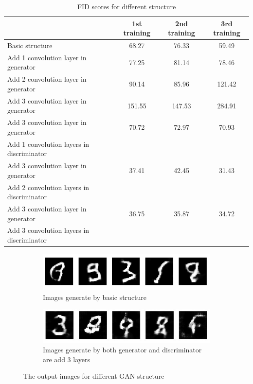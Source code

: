 \begin{table}[h]
    \centering
    \caption{FID scores for different structure}
    \begin{tabular}{|l|c|c|c|}
      \hline
      & 1st training & 2nd training & 3rd training \\
      \hline
      Basic structure & 68.27 & 76.33 & 59.49 \\
      \hline
      Add 1 convolution layer in generator & 77.25 & 81.14 & 78.46 \\
      \hline
      Add 2 convolution layer in generator & 90.14 & 85.96 & 121.42 \\
      \hline
      Add 3 convolution layer in generator & 151.55 & 147.53 & 284.91 \\
      \hline
      \multicolumn{1}{|l|}{Add 3 convolution layer in generator} & 70.72 & 72.97 & 70.93 \\
      \multicolumn{1}{|l|}{Add 1 convolution layers in discriminator} & & & \\
      \hline
      \multicolumn{1}{|l|}{Add 3 convolution layer in generator} & 37.41 & 42.45 & 31.43 \\
      \multicolumn{1}{|l|}{Add 2 convolution layers in discriminator} & & & \\
      \hline
      \multicolumn{1}{|l|}{Add 3 convolution layer in generator} & 36.75 & 35.87 & 34.72 \\
      \multicolumn{1}{|l|}{Add 3 convolution layers in discriminator} & & & \\
      \hline
    \end{tabular}
\end{table}


\begin{figure}[H]
    \centering
    \begin{subfigure}[b]{\linewidth}
        \centering
        \includegraphics[width=0.7\linewidth]{./Images/generate_image_by_convolution_layer.jpg}
        \caption{Images generate by basic structure}
        \label{fig:Dense}
    \end{subfigure}
    \vspace{0.05\linewidth} 
    \begin{subfigure}[b]{\linewidth}
        \centering
        \includegraphics[width=0.7\linewidth]{./Images/both_generator_and_discrimminator_are_add_3_layers.jpg}
        \caption{Images generate by both generator and discriminator are add 3 layers}
        \label{fig:Conv2DTranspose}
    \end{subfigure}
    \caption{The output images for different GAN structure}
    \label{fig:combined}
\end{figure}


